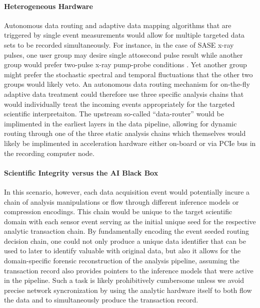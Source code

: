 \documentclass{article}
\begin{document}
\paragraph{Heterogeneous Hardware}
Autonomous data routing and adaptive data mapping algorithms that are triggered by single event measurements \cite{Lutman2016,Wolfi2017_review,Hartmann2018} would allow for multiple targeted data sets to be recorded simultaneously.  
For instance, in the case of SASE x-ray pulses, one user group may desire single attosecond pulse \cite{Cryan2016_impulsive} result while another group would prefer two-pulse x-ray pump-probe conditions \cite{Hartmann2018}.  
Yet another group might prefer the stochastic spectral and temporal fluctuations \cite{Feurer2018,IanRobinson2018,Driver2019_spooktroscopy} that the other two groups would likely veto.  
An autonomous data routing mechanism for on-the-fly adaptive data treatment could therefore use three specific analysis chains that would individually treat the incoming events appropriately for the targeted scientific interpretaiton.
The upstream so-called ``data-router'' \cite{Audrey} would be implimented in the earliest layers in the data pipeline, allowing for dynamic routing through one of the three static analysis chains which themselves would likely be implimented in acceleration hardware either on-board or via PCIe bus in the recording computer node.

\paragraph{Scientific Integrity versus the AI Black Box}
In this scenario, however, each data acquisition event would potentially incure a chain of analysis manipulations or flow through different inference models or compression encodings.
This chain would be unique to the target scientific domain with each sensor event serving as the initial unique seed for the respective analytic transaction chain.
By fundamentally encoding the event seeded routing decision chain, one could not only produce a unique data identifier that can be used to later to identify valuable with original data, but also it allows for the domain-specific forensic reconstruction of the analysis pipeline, assuming the transaction record also provides pointers to the inference models that were active in the pipeline.
Such a task is likely prohibitively cumbersome unless we avoid precise network syncronization by using the analytic hardware itself to both flow the data and to simultaneously produce the transaction record.
\end{document}
